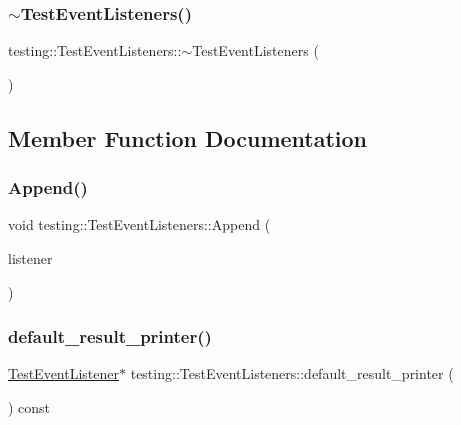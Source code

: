 \subsubsection{\texorpdfstring{$\sim$\+Test\+Event\+Listeners()}{~TestEventListeners()}}
{\footnotesize\ttfamily testing\+::\+Test\+Event\+Listeners\+::$\sim$\+Test\+Event\+Listeners (\begin{DoxyParamCaption}{ }\end{DoxyParamCaption})}



\subsection{Member Function Documentation}
\mbox{\label{classtesting_1_1TestEventListeners_a1207dce74d64c1c39ffa6105560536a0}} 
\subsubsection{\texorpdfstring{Append()}{Append()}}
{\footnotesize\ttfamily void testing\+::\+Test\+Event\+Listeners\+::\+Append (\begin{DoxyParamCaption}\item[{\hyperlink{classtesting_1_1TestEventListener}{Test\+Event\+Listener} $\ast$}]{listener }\end{DoxyParamCaption})}

\mbox{\label{classtesting_1_1TestEventListeners_a6293443acb5af942eeec638b6aa6dcf2}} 
\subsubsection{\texorpdfstring{default\+\_\+result\+\_\+printer()}{default\_result\_printer()}}
{\footnotesize\ttfamily \hyperlink{classtesting_1_1TestEventListener}{Test\+Event\+Listener}$\ast$ testing\+::\+Test\+Event\+Listeners\+::default\+\_\+result\+\_\+printer (\begin{DoxyParamCaption}{ }\end{DoxyParamCaption}) const\hspace{0.3cm}{\ttfamily [inline]}}

